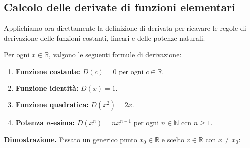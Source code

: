 \begin{esbox}[Controesempio — La funzione valore assoluto $f(x) = |x|$]
\begin{center}
\end{center}
\end{esbox}

\subsection{Calcolo delle derivate di funzioni elementari}

Applichiamo ora direttamente la definizione di derivata per ricavare le regole di derivazione delle funzioni costanti, lineari e delle potenze naturali.

\begin{propbox}
Per ogni $x \in \mathbb{R}$, valgono le seguenti formule di derivazione:
\begin{enumerate}
    \item \textbf{Funzione costante:} $D(c) = 0$ per ogni $c \in \mathbb{R}$.
    \item \textbf{Funzione identità:} $D(x) = 1$.
    \item \textbf{Funzione quadratica:} $D(x^2) = 2x$.
    \item \textbf{Potenza $n$-esima:} $D(x^n) = n x^{n-1}$ per ogni $n \in \mathbb{N}$ con $n \ge 1$.
\end{enumerate}
\end{propbox}

\noindent\textbf{Dimostrazione.} Fissato un generico punto $x_0 \in \mathbb{R}$ e scelto $x \in \mathbb{R}$ con $x \neq x_0$:

